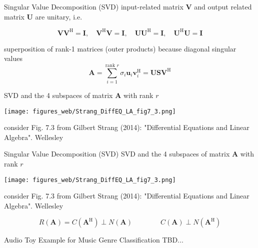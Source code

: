 \documentclass[mathserif, aspectratio=43]{intbeamer}
\begin{document}
\begin{frame}{Singular Value Decomposition (SVD)}
input-related matrix $\bm{V}$ and output related matrix $\bm{U}$ are unitary, i.e.

$$\bm{V}\bm{V}^\mathrm{H}=\bm{I},\quad\bm{V}^\mathrm{H}\bm{V}=\bm{I},\quad\bm{U}\bm{U}^\mathrm{H}=\bm{I},\quad\bm{U}^\mathrm{H}\bm{U}=\bm{I}$$

superposition of rank-1 matrices (outer products) because diagonal singular values
$$\bm{A} = \sum_{i=1}^{\text{rank }r} \sigma_i \bm{u}_i \bm{v}_i^\mathrm{H} = \bm{U} \bm{S} \bm{V}^\mathrm{H}$$

SVD and the 4 subspaces of matrix $\bm{A}$ with rank $r$
\begin{center}
\texttt{[image: figures\_web/Strang\_DiffEQ\_LA\_fig7\_3.png]}
\end{center}
\begin{footnotesize}consider Fig. 7.3 from Gilbert Strang (2014): "Differential Equations and Linear Algebra". Wellesley\end{footnotesize}

\end{frame}


\begin{frame}{Singular Value Decomposition (SVD)}
SVD and the 4 subspaces of matrix $\bm{A}$ with rank $r$
\begin{center}
\texttt{[image: figures\_web/Strang\_DiffEQ\_LA\_fig7\_3.png]}
\end{center}
\begin{footnotesize}consider Fig. 7.3 from Gilbert Strang (2014): "Differential Equations and Linear Algebra". Wellesley\end{footnotesize}

$$R(\bm{A}) = C(\bm{A}^\mathrm{H})\perp N(\bm{A})
\qquad\qquad C(\bm{A}) \perp N(\bm{A}^\mathrm{H})$$

\end{frame}







\begin{frame}{Audio Toy Example for Music Genre Classification}
TBD...
\end{frame}




\end{document}

